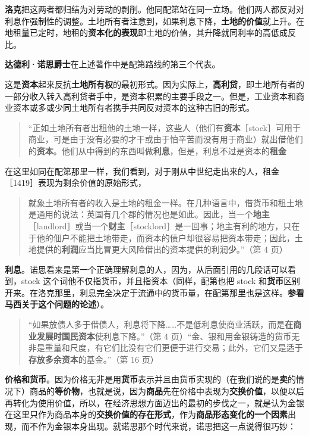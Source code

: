 \textbf{洛克}把这两者都归结为对劳动的剥削。他同配第站在同一立场。他们两人都反对对利息作强制性的调整。土地所有者注意到，如果利息下降，\textbf{土地的价值}就上升。在地租量已定时，地租的\textbf{资本化的表现}即土地的价值，其升降就同利率的高低成反比。

\textbf{达德利·诺思爵士}在上述著作中是配第路线的第三个代表。

这是\textbf{资本}起来反抗\textbf{土地所有权}的最初形式。因为实际上，\textbf{高利贷}，即土地所有者的一部分收入转入高利贷者手中，是资本积累的主要手段之一。但是，工业资本和商业资本或多或少同土地所有者携手共同反对资本的这种古旧的形式。

\begin{quote}“正如土地所有者出租他的土地一样，这些人（他们有\textbf{资本}［stock］可用于商业，可是由于没有必要的才干或由于怕辛苦而没有用于商业）就出借他们的\textbf{资本}。他们从中得到的东西叫做\textbf{利息}，但是，利息不过是资本的\textbf{租金}\end{quote}

\fontbox{~\{}在这里如同在配第那里一样，我们看到，对于刚从中世纪走出来的人，租金［1419］表现为剩余价值的原始形式\fontbox{\}~}，

\begin{quote}就象土地所有者的收入是土地的租金一样。在几种语言中，借货币和租土地是通用的说法：英国有几个郡的情况也是如此。因此，当一个\textbf{地主}［landlord］或当一个\textbf{财主}［stocklord］是一回事；地主有利的地方，只在于他的佃户不能把土地带走，而资本的债户却很容易把资本带走；因此，土地提供的\textbf{利润}应当比冒更大风险借出的资本提供的利润\textbf{少}。”（第 4 页）\end{quote}

\textbf{利息}。诺思看来是第一个正确理解利息的人，因为，从后面引用的几段话可以看到，stock 这个词他不仅指货币，并且指资本（同样，配第也把 stock 和\textbf{货币}区别开来。在洛克那里，利息完全决定于流通中的货币量，在配第那里也是这样。\textbf{参看马西关于这个问题的论述}）。

\begin{quote}“如果放债人多于借债人，利息将下降……不是低利息使商业活跃，而是\textbf{在商业发展时国民资本}使利息下降。”（第 4 页）“金、银和用金银铸造的货币无非是重量和尺度，有它们比没有它们更便于进行交易；此外，它们又是适于\textbf{存放多余资本}的基金。”（第 16 页）\end{quote}

\textbf{价格和货币}。因为价格无非是用\textbf{货币}表示并且由货币实现的（在我们说的是\textbf{卖}的情况下）商品的\textbf{等价物}，也就是说，因为\textbf{商品}先在价格中表现为\textbf{交换价值}，以便以后再转化为使用价值，所以，在经济思想方面迈出的最初的步伐之一，就是认为金银在这里只作为商品本身的\textbf{交换价值的存在形式}，作为\textbf{商品形态变化的一个因素}出现，而不作为金银本身出现。就诺思那个时代来说，诺思把这一点说得很巧妙：

